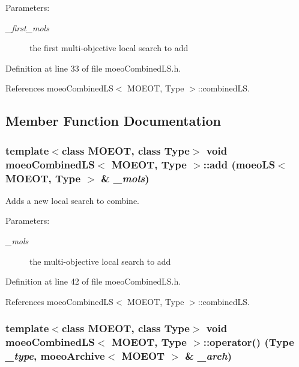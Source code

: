 \begin{Desc}
\item[Parameters:]
\begin{description}
\item[{\em \_\-first\_\-mols}]the first multi-objective local search to add \end{description}
\end{Desc}


Definition at line 33 of file moeo\-Combined\-LS.h.

References moeo\-Combined\-LS$<$ MOEOT, Type $>$::combined\-LS.

\subsection{Member Function Documentation}
\subsubsection{\setlength{\rightskip}{0pt plus 5cm}template$<$class MOEOT, class Type$>$ void \bf{moeo\-Combined\-LS}$<$ MOEOT, Type $>$::add (\bf{moeo\-LS}$<$ MOEOT, Type $>$ \& {\em \_\-mols})\hspace{0.3cm}{\tt  [inline]}}\label{classmoeoCombinedLS_1637b4dcf2dd694cc9ffbad605b2bf13}


Adds a new local search to combine. 

\begin{Desc}
\item[Parameters:]
\begin{description}
\item[{\em \_\-mols}]the multi-objective local search to add \end{description}
\end{Desc}


Definition at line 42 of file moeo\-Combined\-LS.h.

References moeo\-Combined\-LS$<$ MOEOT, Type $>$::combined\-LS.
\subsubsection{\setlength{\rightskip}{0pt plus 5cm}template$<$class MOEOT, class Type$>$ void \bf{moeo\-Combined\-LS}$<$ MOEOT, Type $>$::operator() (Type {\em \_\-type}, \bf{moeo\-Archive}$<$ MOEOT $>$ \& {\em \_\-arch})\hspace{0.3cm}{\tt  [inline, virtual]}}\label{classmoeoCombinedLS_634d7fa3092fe8f88a1b54cacfdc35fd}


